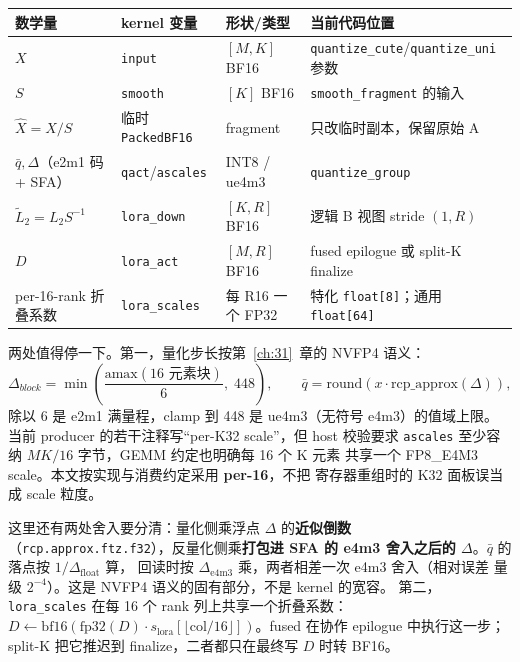\begin{center}\small
\begin{tabular}{@{}llll@{}}
\toprule
数学量 & kernel 变量 & 形状/类型 & 当前代码位置 \\
\midrule
$X$ & \texttt{input} & $[M,K]$ BF16 & \texttt{quantize\_cute}/\texttt{quantize\_uni} 参数 \\
$S$ & \texttt{smooth} & $[K]$ BF16 & \texttt{smooth\_fragment} 的输入 \\
$\widehat X=X/S$ & 临时 \texttt{PackedBF16} & fragment & 只改临时副本，保留原始 A \\
$\bar q,\Delta$（e2m1 码 + SFA） & \texttt{qact}/\texttt{ascales} & INT8 / ue4m3 & \texttt{quantize\_group} \\
$\widetilde L_2=L_2S^{-1}$ & \texttt{lora\_down} & $[K,R]$ BF16 & 逻辑 B 视图 stride $(1,R)$ \\
$D$ & \texttt{lora\_act} & $[M,R]$ BF16 & fused epilogue 或 split-K finalize \\
per-16-rank 折叠系数 & \texttt{lora\_scales} & 每 R16 一个 FP32 & 特化 \texttt{float[8]}；通用 \texttt{float[64]} \\
\bottomrule
\end{tabular}
\end{center}

两处值得停一下。第一，量化步长按第~\ref{ch:31}~章的 NVFP4 语义：
\begin{equation}
  \Delta_{block}=\min\!\left(\frac{\mathrm{amax}(16\text{ 元素块})}{6},\;448\right),
  \qquad \bar q=\mathrm{round}\!\left(x\cdot\mathrm{rcp\_approx}(\Delta)\right),
  \label{eq:39-scale}
\end{equation}
除以 6 是 e2m1 满量程，clamp 到 448 是 ue4m3（无符号 e4m3）的值域上限。
当前 producer 的若干注释写“per-K32 scale”，但 host 校验要求
\texttt{ascales} 至少容纳 $MK/16$ 字节，GEMM 约定也明确每 16 个 K 元素
共享一个 FP8\_E4M3 scale。本文按实现与消费约定采用 \textbf{per-16}，不把
寄存器重组时的 K32 面板误当成 scale 粒度。

这里还有两处舍入要分清：量化侧乘浮点 $\Delta$ 的\textbf{近似倒数}
（\texttt{rcp.approx.ftz.f32}），反量化侧乘\textbf{打包进 SFA 的 e4m3
舍入之后的 $\Delta$}。$\bar q$ 的落点按 $1/\Delta_{\text{float}}$ 算，
回读时按 $\Delta_{\text{e4m3}}$ 乘，两者相差一次 e4m3 舍入（相对误差
量级 $2^{-4}$）。这是 NVFP4 语义的固有部分，不是 kernel 的宽容。
第二，\texttt{lora\_scales} 在每 16 个 rank 列上共享一个折叠系数：
$D\leftarrow\mathrm{bf16}(\mathrm{fp32}(D)\cdot
s_{\text{lora}}[\lfloor\mathrm{col}/16\rfloor])$。fused 在协作 epilogue
中执行这一步；split-K 把它推迟到 finalize，二者都只在最终写 $D$ 时转
BF16。

